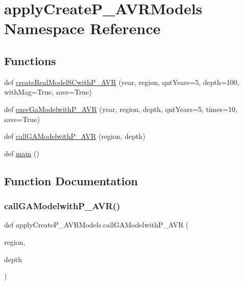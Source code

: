 \hypertarget{namespaceapply_create_p___a_v_r_models}{}\section{apply\+Create\+P\+\_\+\+A\+V\+R\+Models Namespace Reference}
\label{namespaceapply_create_p___a_v_r_models}
\subsection*{Functions}
\begin{DoxyCompactItemize}
\item 
def \hyperlink{namespaceapply_create_p___a_v_r_models_a27dea38c91f34c55c0c69108573986d2}{create\+Real\+Model\+S\+Cwith\+P\+\_\+\+A\+VR} (year, region, qnt\+Years=5, depth=100, with\+Mag=True, save=True)
\item 
def \hyperlink{namespaceapply_create_p___a_v_r_models_a5d841325fbbaef43baf47142199d52ca}{exec\+Ga\+Modelwith\+P\+\_\+\+A\+VR} (year, region, depth, qnt\+Years=5, times=10, save=True)
\item 
def \hyperlink{namespaceapply_create_p___a_v_r_models_ab303f5303fbf73882287a198a5a4f75e}{call\+G\+A\+Modelwith\+P\+\_\+\+A\+VR} (region, depth)
\item 
def \hyperlink{namespaceapply_create_p___a_v_r_models_a3f91842d1a2b290ab21b5efefb59ba08}{main} ()
\end{DoxyCompactItemize}


\subsection{Function Documentation}
\mbox{\label{namespaceapply_create_p___a_v_r_models_ab303f5303fbf73882287a198a5a4f75e}} 
\subsubsection{\texorpdfstring{call\+G\+A\+Modelwith\+P\+\_\+\+A\+V\+R()}{callGAModelwithP\_AVR()}}
{\footnotesize\ttfamily def apply\+Create\+P\+\_\+\+A\+V\+R\+Models.\+call\+G\+A\+Modelwith\+P\+\_\+\+A\+VR (\begin{DoxyParamCaption}\item[{}]{region,  }\item[{}]{depth }\end{DoxyParamCaption})}

